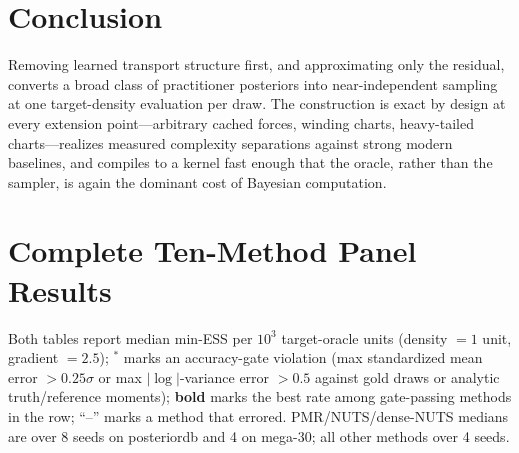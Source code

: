 \documentclass[11pt]{article}
\theoremstyle{remark}
\begin{document}
\section{Conclusion}
Removing learned transport structure first, and approximating only the
residual, converts a broad class of practitioner posteriors into
near-independent sampling at one target-density evaluation per draw. The
construction is exact by design at every extension point---arbitrary
cached forces, winding charts, heavy-tailed charts---realizes measured
complexity separations against strong modern baselines, and compiles to
a kernel fast enough that the oracle, rather than the sampler, is again
the dominant cost of Bayesian computation.

\appendix
\section{Complete Ten-Method Panel Results}\label{app:panels}
Both tables report median min-ESS per $10^3$ target-oracle units
(density $=1$ unit, gradient $=2.5$); $^{*}$ marks an accuracy-gate
violation (max standardized mean error $>0.25\sigma$ or max
$|\log|$-variance error $>0.5$ against gold draws or analytic
truth/reference moments); \textbf{bold} marks the best rate among
gate-passing methods in the row; ``--'' marks a method that errored.
PMR/NUTS/dense-NUTS medians are over 8 seeds on posteriordb and 4 on
mega-30; all other methods over 4 seeds.

\begin{landscape}
\begin{table}
\caption{posteriordb: 37 posteriors $\times$ 10 methods, gold-judged.}
\label{tab:pdbfull}
\centering\footnotesize

\end{table}

\begin{table}
\caption{mega-30 controlled stress panel: 30 targets $\times$ 10
methods, truth/reference-judged.}
\label{tab:megafull}
\centering\footnotesize

\end{table}
\end{landscape}
\end{document}
